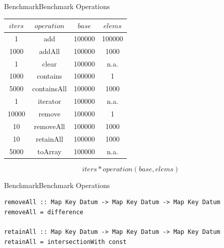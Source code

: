    \begin{frame}{Benchmark}{Benchmark Operations}

        \begin{table}[h]

            \centering

            \label{tab:benchmarkOperations}

            \begin{tabular}{|c|c|c|c|}

                \hline

                $iters$ & $operation$ & $base$ & $elems$ \\
          
                \hline
                1     & add         & 100000 & 100000 \\
                1000  & addAll      & 100000 & 1000   \\
                1     & clear       & 100000 & n.a.   \\
                1000  & contains    & 100000 & 1      \\
                5000  & containsAll & 100000 & 1000   \\
                1     & iterator    & 100000 & n.a.   \\
                10000 & remove      & 100000 & 1      \\
                10    & removeAll   & 100000 & 1000   \\
                10    & retainAll   & 100000 & 1000   \\
                5000  & toArray     & 100000 & n.a.   \\
          
                \hline


            \end{tabular}


        \end{table}

	$$ iters * operation( base , elems ) $$

    \end{frame}



    \begin{frame}[fragile]{Benchmark}{Benchmark Operations}

	\begin{verbatim}
removeAll :: Map Key Datum -> Map Key Datum -> Map Key Datum
removeAll = difference

retainAll :: Map Key Datum -> Map Key Datum -> Map Key Datum
retainAll = intersectionWith const
	\end{verbatim}


    \end{frame}



